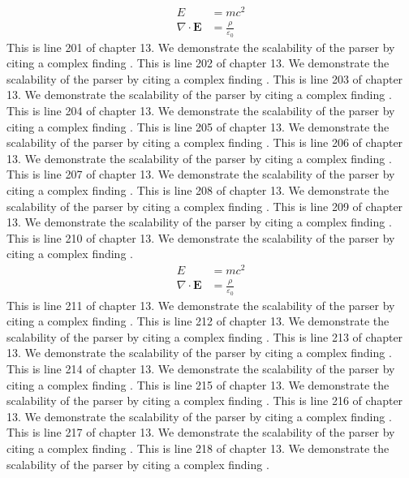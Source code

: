 \begin{align*}
  E &= mc^2 \\
  \nabla \cdot \mathbf{E} &= \frac{\rho}{\varepsilon_0}
\end{align*}
This is line 201 of chapter 13. We demonstrate the scalability of the parser by citing a complex finding \cite{ref13_201}.
This is line 202 of chapter 13. We demonstrate the scalability of the parser by citing a complex finding \cite{ref13_202}.
This is line 203 of chapter 13. We demonstrate the scalability of the parser by citing a complex finding \cite{ref13_203}.
This is line 204 of chapter 13. We demonstrate the scalability of the parser by citing a complex finding \cite{ref13_204}.
This is line 205 of chapter 13. We demonstrate the scalability of the parser by citing a complex finding \cite{ref13_205}.
This is line 206 of chapter 13. We demonstrate the scalability of the parser by citing a complex finding \cite{ref13_206}.
This is line 207 of chapter 13. We demonstrate the scalability of the parser by citing a complex finding \cite{ref13_207}.
This is line 208 of chapter 13. We demonstrate the scalability of the parser by citing a complex finding \cite{ref13_208}.
This is line 209 of chapter 13. We demonstrate the scalability of the parser by citing a complex finding \cite{ref13_209}.
This is line 210 of chapter 13. We demonstrate the scalability of the parser by citing a complex finding \cite{ref13_210}.
\begin{align*}
  E &= mc^2 \\
  \nabla \cdot \mathbf{E} &= \frac{\rho}{\varepsilon_0}
\end{align*}
This is line 211 of chapter 13. We demonstrate the scalability of the parser by citing a complex finding \cite{ref13_211}.
This is line 212 of chapter 13. We demonstrate the scalability of the parser by citing a complex finding \cite{ref13_212}.
This is line 213 of chapter 13. We demonstrate the scalability of the parser by citing a complex finding \cite{ref13_213}.
This is line 214 of chapter 13. We demonstrate the scalability of the parser by citing a complex finding \cite{ref13_214}.
This is line 215 of chapter 13. We demonstrate the scalability of the parser by citing a complex finding \cite{ref13_215}.
This is line 216 of chapter 13. We demonstrate the scalability of the parser by citing a complex finding \cite{ref13_216}.
This is line 217 of chapter 13. We demonstrate the scalability of the parser by citing a complex finding \cite{ref13_217}.
This is line 218 of chapter 13. We demonstrate the scalability of the parser by citing a complex finding \cite{ref13_218}.
